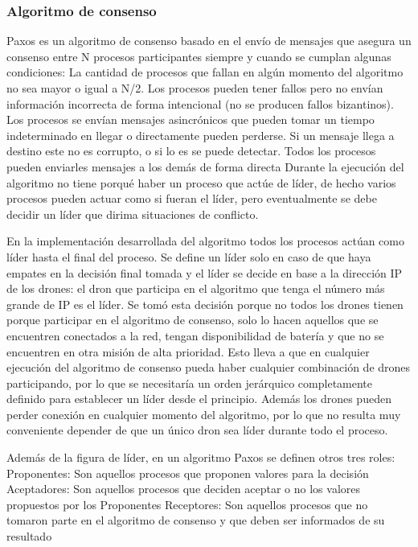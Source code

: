 \subsubsection{Algoritmo de consenso}
Paxos es un algoritmo de consenso basado en el envío de mensajes que asegura un consenso entre N procesos participantes siempre y cuando se cumplan algunas condiciones:
La cantidad de procesos que fallan en algún momento del algoritmo no sea mayor o igual a N/2.
Los procesos pueden tener fallos pero no envían información incorrecta de forma intencional (no se producen fallos bizantinos).
Los procesos se envían mensajes asincrónicos que pueden tomar un tiempo indeterminado en llegar o directamente pueden perderse.
Si un mensaje llega a destino este no es corrupto, o si lo es se puede detectar.
Todos los procesos pueden enviarles mensajes a los demás de forma directa
Durante la ejecución del algoritmo no tiene porqué haber un proceso que actúe de líder, de hecho varios procesos pueden actuar como si fueran el líder, pero eventualmente se debe decidir un líder que dirima situaciones de conflicto.

En la implementación desarrollada del algoritmo todos los procesos actúan como líder hasta el final del proceso. Se define un líder solo en caso de que haya empates en la decisión final tomada y el líder se decide en base a la dirección IP de los drones: el dron que participa en el algoritmo que tenga el número más grande de IP es el líder. Se tomó esta decisión porque no todos los drones tienen porque participar en el algoritmo de consenso, solo lo hacen aquellos que se encuentren conectados a la red, tengan disponibilidad de batería y que no se encuentren en otra misión de alta prioridad. Esto lleva a que en cualquier ejecución del algoritmo de consenso pueda haber cualquier combinación de drones participando, por lo que se necesitaría un orden jerárquico completamente definido para establecer un líder desde el principio. Además los drones pueden perder conexión en cualquier momento del algoritmo, por lo que no resulta muy conveniente depender de que un único dron sea líder durante todo el proceso.

Además de la figura de líder, en un algoritmo Paxos se definen otros tres roles:
Proponentes: Son aquellos procesos que proponen valores para la decisión
Aceptadores: Son aquellos procesos que deciden aceptar o no los valores propuestos por los Proponentes
Receptores: Son aquellos procesos que no tomaron parte en el algoritmo de consenso y que deben ser informados de su resultado

